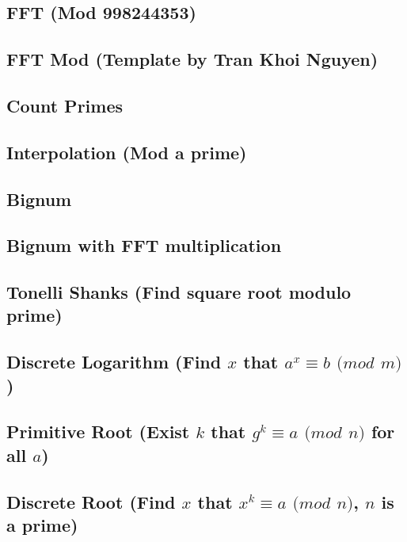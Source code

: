 \subsection{FFT (Mod 998244353)}
\raggedbottom
\hrulefill
\subsection{FFT Mod (Template by Tran Khoi Nguyen)}
\raggedbottom
\hrulefill
\subsection{Count Primes}
\raggedbottom
\hrulefill
\subsection{Interpolation (Mod a prime)}
\raggedbottom
\hrulefill
\subsection{Bignum}
\raggedbottom
\hrulefill
\subsection{Bignum with FFT multiplication}
\raggedbottom
\hrulefill
\subsection{Tonelli Shanks (Find square root modulo prime)}
\raggedbottom
\hrulefill
\subsection{Discrete Logarithm (Find $x$ that $a^x \equiv b$ $(mod$ $m)$)}
\raggedbottom
\hrulefill
\subsection{Primitive Root (Exist $k$ that $g^k \equiv a$ $(mod$ $n)$ for all $a$)}
\raggedbottom
\hrulefill
\subsection{Discrete Root (Find $x$ that $x^k \equiv a$ $(mod$ $n)$, $n$ is a prime)}
\raggedbottom
\hrulefill
